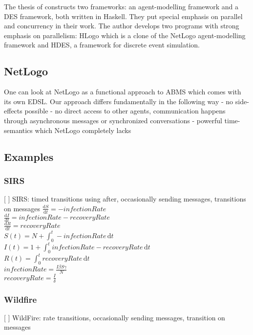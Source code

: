 The thesis of \cite{bezirgiannis_improving_2013} constructs two frameworks: an agent-modelling framework and a DES framework, both written in Haskell. They put special emphasis on parallel and concurrency in their work. The author develops two programs with strong emphasis on parallelism: HLogo which is a clone of the NetLogo agent-modelling framework and HDES, a framework for discrete event simulation.

\subsection{NetLogo}
One can look at NetLogo as a functional approach to ABMS which comes with its own EDSL. Our approach differs fundamentally in the following way
	- no side-effects possible
	- no direct access to other agents, communication happens through asynchronous messages or synchronized conversations
	- powerful time-semantics which NetLogo completely lacks 
	
\subsection{Examples}

\subsubsection{SIRS}
[ ] SIRS: timed transitions using after, occasionally sending messages, transitions on messages
$\frac{\mathrm d S}{\mathrm d t} = -infectionRate$ \\
$\frac{\mathrm d I}{\mathrm d t} = infectionRate - recoveryRate$ \\
$\frac{\mathrm d R}{\mathrm d t} = recoveryRate$ \\

$S(t) = N + \int_0^t -infectionRate\, \mathrm{d}t$ \\
$I(t) = 1 + \int_0^t infectionRate - recoveryRate\, \mathrm{d}t$ \\
$R(t) = \int_0^t recoveryRate\, \mathrm{d}t$ \\

$infectionRate = \frac{I \beta S \gamma}{N}$ \\
$recoveryRate = \frac{I}{\delta}$ \\
\subsubsection{Wildfire}
[ ] WildFire: rate transitions, occasionally sending messages, transition on messages